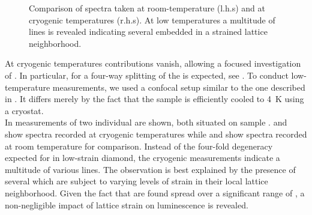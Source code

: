 \begin{figure}[!htb]
\begin{subfigure}[t]{ 0.49\linewidth}
					\caption{}
					\label{subfig::roomtep2}
				\end{subfigure}
				\hfill
				\begin{subfigure}[t]{ 0.49\linewidth}
					\centering
					\caption{}
					\label{subfig::cryo2}
				\end{subfigure}
				\caption[Spectra of \nds at cryogenic temperatures]{Comparison of spectra taken at room-temperature (l.h.s) and at cryogenic temperatures (r.h.s). At low temperatures a multitude of lines is revealed indicating several \sivs embedded in a strained lattice neighborhood.}
				\label{fig::rt_vs_cryo}
			\end{figure}

			At cryogenic temperatures \psb contributions vanish, allowing a focused investigation of \zpls.
			In particular, for \sivs a four-way splitting of the \zpl is expected, see .
			To conduct low-temperature measurements, we used a confocal setup similar to the one described in .
			It differs merely by the fact that the sample is efficiently cooled to \SI{4}{\kelvin} using a cryostat.
			\\
			In  measurements of two individual \nds are shown, both situated on sample \insituSo.
			 and  show spectra recorded at cryogenic temperatures while  and  show spectra recorded at room temperature for comparison.
			Instead of the four-fold degeneracy expected for \sivs in low-strain diamond, the cryogenic measurements indicate a multitude of various lines.
			The observation is best explained by the presence of several \sivs which are subject to varying levels of strain in their local lattice neighborhood.
			Given the fact that \zpls are found spread over a significant range of \wls, a non-negligible impact of lattice strain on \siv luminescence is revealed.
